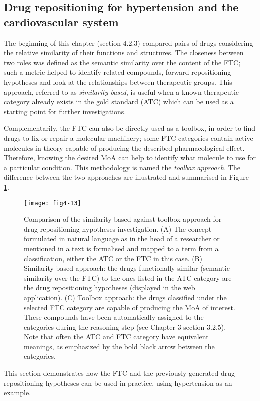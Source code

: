 \subsection{Drug repositioning for hypertension and the cardiovascular system}
The beginning of this chapter (section 4.2.3) compared pairs of drugs considering the relative similarity of their functions and structures. The closeness between two roles was defined as the semantic similarity over the content of the FTC; such a metric helped to identify related compounds, forward repositioning hypotheses and look at the relationships between therapeutic groups. This approach, referred to as \emph{similarity-based}, is useful when a known therapeutic category already exists in the gold standard (ATC) which can be used as a starting point for further investigations.

Complementarily, the FTC can also be directly used as a toolbox, in order to find drugs to fix or repair a molecular machinery; some FTC categories contain active molecules in theory capable of producing the described pharmacological effect. Therefore, knowing the desired MoA can help to identify what molecule to use for a particular condition. This methodology is named the \emph{toolbox approach}. The difference between the two approaches are illustrated and summarised in Figure \ref{fig4-13}.

\begin{figure}[ht]
    \centering
    \texttt{[image: fig4-13]}
    \caption{Comparison of the similarity-based against toolbox approach for drug repositioning hypotheses investigation. (A) The concept formulated in natural language as in the head of a researcher or mentioned in a text is formalised and mapped to a term from a classification, either the ATC or the FTC in this case. (B) Similarity-based approach: the drugs functionally similar (semantic similarity over the FTC) to the ones listed in the ATC category are the drug repositioning hypotheses (displayed in the web application). (C) Toolbox approach: the drugs classified under the selected FTC category are capable of producing the MoA of interest. These compounds have been automatically assigned to the categories during the reasoning step (see Chapter 3 section 3.2.5). Note that often the ATC and FTC category have equivalent meanings, as emphasized by the bold black arrow between the categories.}
    \label{fig4-13}
\end{figure}

This section demonstrates how the FTC and the previously generated drug repositioning hypotheses can be used in practice, using hypertension as an example.

